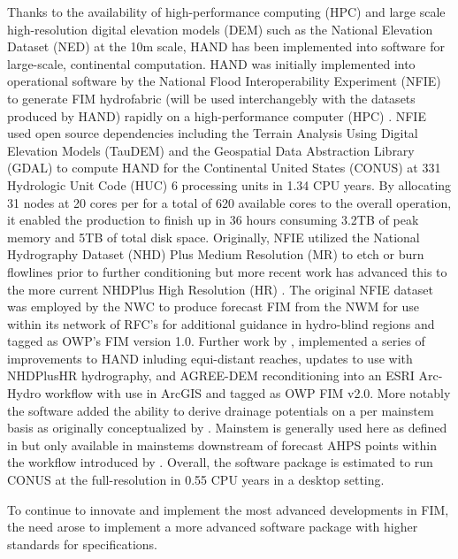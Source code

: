Thanks to the availability of high-performance computing (HPC) and large scale high-resolution digital elevation models (DEM) such as the National Elevation Dataset (NED) at the 10m scale, HAND has been implemented into software for large-scale, continental computation. 
HAND was initially implemented into operational software by the National Flood Interoperability Experiment (NFIE) to generate FIM hydrofabric (will be used interchangebly with the datasets produced by HAND) rapidly on a high-performance computer (HPC) \cite{maidment2017conceptual,liu2016cybergis}. 
NFIE used open source dependencies including the Terrain Analysis Using Digital Elevation Models (TauDEM) \cite{tarboton2005terrain} and the Geospatial Data Abstraction Library (GDAL) \cite{warmerdam2008geospatial} to compute HAND for the Continental United States (CONUS) at 331 Hydrologic Unit Code (HUC) 6 processing units in 1.34 CPU years.
By allocating 31 nodes at 20 cores per for a total of 620 available cores to the overall operation, it enabled the production to finish up in 36 hours consuming 3.2TB of peak memory and 5TB of total disk space.
Originally, NFIE utilized the National Hydrography Dataset (NHD) Plus Medium Resolution (MR) to etch or burn flowlines prior to further conditioning but more recent work has advanced this to the more current NHDPlus High Resolution (HR) \cite{liu2020height}. 
The original NFIE dataset was employed by the NWC to produce forecast FIM from the NWM for use within its network of RFC's for additional guidance in hydro-blind regions and tagged as OWP's FIM version 1.0.
Further work by , implemented a series of improvements to HAND inluding equi-distant reaches, updates to use with NHDPlusHR hydrography, and AGREE-DEM reconditioning \cite{hellweger1997agree} into an ESRI Arc-Hydro workflow with use in ArcGIS and tagged as OWP FIM v2.0. 
More notably the software added the ability to derive drainage potentials on a per mainstem basis as originally conceptualized by \cite{mcgehee2016modified}.
Mainstem is generally used here as defined in  but only available in mainstems downstream of forecast AHPS points within the workflow introduced by .
Overall, the software package is estimated to run CONUS at the full-resolution in 0.55 CPU years in a desktop setting.


To continue to innovate and implement the most advanced developments in FIM, the need arose to implement a more advanced software package with higher standards for specifications.

